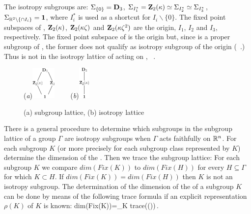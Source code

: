 \begin{example}
The isotropy subgroups are: $\Sigma_{\{0\}}=\mathbf{D}_3$, $\Sigma_{I_1^*}=\mathbf{Z}_2(\kappa)\simeq\Sigma_{I_2^*}\simeq\Sigma_{I_3^*}$, $\Sigma_{\mathbb{R}^{2}\backslash\{\cap I_i\}}=\mathbf{1}$, 
where $I_i^*$ is used as a shortcut for $I_i\backslash\{0\}$. The fixed point subspaces of , $\mathbf{Z}_2(\kappa)$, $\mathbf{Z}_2(\kappa\zeta)$ and $\mathbf{Z}_2(\kappa\zeta^2)$ 
are the origin, $I_1$, $I_2$ and $I_3$, respectively. The fixed point subspace of  is the origin but, since  is a proper subgroup of ,
the former does not qualify as isotropy subgroup of the origin (\cf~.) Thus  is not in the isotropy lattice
of  acting on , \cf~.

\begin{figure}
\begin{center}
  (\textit{a})\includegraphics[width=0.105\textwidth]{../figs/D3lattice}
~~~~(\textit{b})\includegraphics[width=0.05\textwidth]{../figs/D3stablattice}
\end{center}
\caption[D3 lattices]{
    {\small
    (a)  subgroup lattice, (b)  isotropy lattice}}
\label{fig:D3lattice}
    \vspace*{-5pt}
\end{figure}

\end{example}

There is a general procedure to determine which subgroups in the subgroup lattice of a group $\Gamma$ are isotropy 
subgroups when $\Gamma$ acts faithfully on $\mathbb{R}^{n}$. 
For each subgroup $K$ (or more precisely for each subgroup class represented by $K$) 
determine the dimension of the \fixedsp. Then we trace the subgroup lattice: For each subgroup
$K$ we compare $dim(Fix(K))$ to $dim(Fix(H))$ for every $H\subseteq\Gamma$ for which $K\subset H$. 
If  $dim(Fix(K))=dim(Fix(H))$ then $K$ is not an isotropy subgroup. The determination of the dimension of the 
\fixedsp of a subgroup $K$ can be done by means of the following trace formula if an explicit representation
$\rho(K)$ of $K$ is known:
\beq
	dim(Fix(K))=\sum_{\kappa\in K} trace(\rho(\kappa))\,.
\eeq

